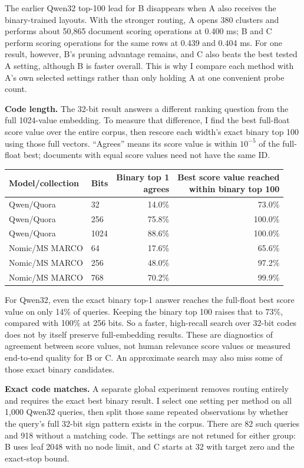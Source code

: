 The earlier Qwen32 top-100 lead for B disappears when A also receives the binary-trained layouts. With the stronger routing, A opens 380 clusters and performs about 50,865 document scoring operations at 0.400 ms; B and C perform scoring operations for the same rows at 0.439 and 0.404 ms. For one result, however, B's pruning advantage remains, and C also beats the best tested A setting, although B is faster overall. This is why I compare each method with A's own selected settings rather than only holding A at one convenient probe count.

\textbf{Code length.}
The 32-bit result answers a different ranking question from the full 1024-value embedding. To measure that difference, I find the best full-float score value over the entire corpus, then rescore each width's exact binary top 100 using those full vectors. ``Agrees'' means its score value is within $10^{-5}$ of the full-float best; documents with equal score values need not have the same ID.

\begin{center}\small
\begin{tabular}{@{}llrr@{}}\toprule
Model/collection & Bits & \shortstack{Binary top 1\\agrees} & \shortstack{Best score value reached\\within binary top 100}\\\midrule
Qwen/Quora & 32 & 14.0\% & 73.0\%\\
Qwen/Quora & 256 & 75.8\% & 100.0\%\\
Qwen/Quora & 1024 & 88.6\% & 100.0\%\\
Nomic/MS MARCO & 64 & 17.6\% & 65.6\%\\
Nomic/MS MARCO & 256 & 48.0\% & 97.2\%\\
Nomic/MS MARCO & 768 & 70.2\% & 99.9\%\\\bottomrule
\end{tabular}
\end{center}
For Qwen32, even the exact binary top-1 answer reaches the full-float best score value on only 14\% of queries. Keeping the binary top 100 raises that to 73\%, compared with 100\% at 256 bits. So a faster, high-recall search over 32-bit codes does not by itself preserve full-embedding results. These are diagnostics of agreement between score values, not human relevance score values or measured end-to-end quality for B or C. An approximate search may also miss some of those exact binary candidates.

\textbf{Exact code matches.}
A separate global experiment removes routing entirely and requires the exact best binary result. I select one setting per method on all 1,000 Qwen32 queries, then split those same repeated observations by whether the query's full 32-bit sign pattern exists in the corpus. There are 82 such queries and 918 without a matching code. The settings are not retuned for either group: B uses leaf 2048 with no node limit, and C starts at 32 with target zero and the exact-stop bound.

